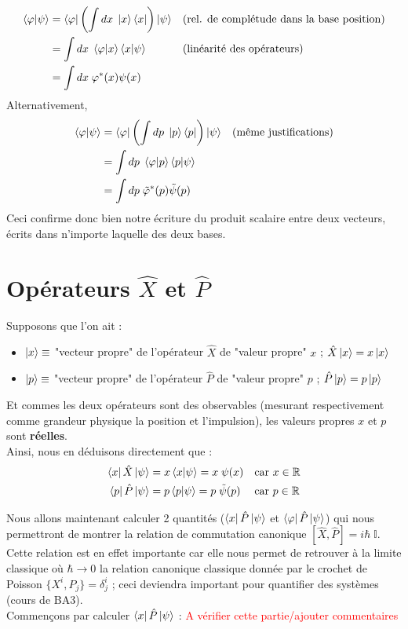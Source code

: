 \documentclass[../notesdecours]{subfiles}
\begin{document}
\begin{align}
	\braket{\varphi | \psi} &= \bra{\varphi} \left( \int dx \; \ket{x}\bra{x} \right) \ket{\psi}  && \text{(rel. de complétude dans la base position)} \notag\\
	&= \int dx \; \braket{\varphi |x}\braket{x|\psi} && \text{(linéarité des opérateurs)} \notag \\
        &= \int dx \; \varphi^*(x)\psi(x) \notag
\end{align}
Alternativement,
\begin{align}
	\braket{\varphi | \psi} &= \bra{\varphi} \left( \int dp \; \ket{p}\bra{p} \right) \ket{\psi} && \text{(même justifications)}\notag\\
        &= \int dp \; \braket{\varphi |p}\braket{p|\psi} \notag\\
        &= \int dp \; \tilde{\varphi}^*(p)\tilde{\psi}(p)\notag
\end{align}
Ceci confirme donc bien notre écriture du produit scalaire entre deux vecteurs, écrits dans n'importe laquelle des deux bases.
\section{Opérateurs $\hat{X}$ et $\hat{P}$}

Supposons que l'on ait : \begin{itemize}[label=\textbullet]
    \item $\ket{x} \equiv$ "vecteur propre" de l'opérateur $\hat{X}$ de "valeur propre" $x$ ; $\hat{X}\ket{x} = x\ket{x}$
    \item $\ket{p} \equiv$ "vecteur propre" de l'opérateur $\hat{P}$ de "valeur propre" $p$ ; $\hat{P}\ket{p} = p\ket{p}$
\end{itemize}
Et commes les deux opérateurs sont des observables (mesurant respectivement comme grandeur physique la position et l'impulsion), les valeurs propres $x$ et $p$ sont \textbf{réelles}. \\

Ainsi, nous en déduisons directement que : 
\begin{align}
    \bra{x}\hat{X}\ket{\psi} &= x \braket{x|\psi} = x \; \psi(x)  && \text{car $x\in \mathbb{R}$} \notag\\
	\bra{p}\hat{P}\ket{\psi} &= p \braket{p|\psi} = p \; \tilde{\psi}(p) && \text{car $p\in \mathbb{R}$} \label{eq:chap6-p_P_psi}
\end{align}

Nous allons maintenant calculer 2 quantités ($\bra{x}\hat{P}\ket{\psi}$ et $\bra{\varphi} \hat{P} \ket{\psi}$) qui nous permettront de montrer la relation de commutation canonique $[ \hat{X}, \hat{P}] = i\hbar \; \mathbb{I}$. Cette relation est en effet importante car elle nous permet de retrouver à la limite classique où $\hbar \rightarrow 0$ la relation canonique classique donnée par le crochet de Poisson $\{ X^i,P_j \} = \delta^i_j$ ; ceci deviendra important pour quantifier des systèmes (cours de BA3). \\
Commençons par calculer $\bra{x}\hat{P}\ket{\psi}$ : \textcolor{red}{A vérifier cette partie/ajouter commentaires}
\end{document}
